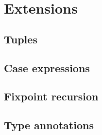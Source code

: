 \chapter{Extensions}
\label{cap:Extensions}
\section{Tuples}
\section{Case expressions}
\section{Fixpoint recursion}
\section{Type annotations}

